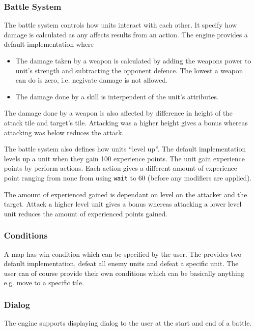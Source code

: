 \subsubsection{Battle System}
\label{ssub:battle_system}

The battle system controls how units interact with each other.  It specify how damage is calculated as any affects results from an action. The engine provides a default implementation where 
\begin{itemize}
	\item The damage taken by a weapon is calculated by adding the weapons power to unit's strength and subtracting the opponent defence. The lowest a weapon can do is zero, i.e. negivate damage is not allowed.
	\item The damage done by a skill is interpendent of the unit's attributes.
\end{itemize}

The damage done by a weapon is also affected by difference in height of the attack tile and target's tile. Attacking was a higher height gives a bonus whereas attacking was below reduces the attack.


The battle system also defines how units ``level up''. The default implementation levels up a unit when they gain 100 experience points. The unit gain experience points by perform actions. Each action gives a different amount of experience point ranging from none from using \texttt{wait} to 60 (before any modifiers are applied).

The amount of experienced gained is dependant on level on the attacker and the target. Attack a higher level unit gives a bonus whereas attacking a lower level unit reduces the amount of experienced points gained.

\subsubsection{Conditions}
\label{ssub:events}

A map has win condition which can be specified by the user.  The provides two default implementation, defeat all enemy units and defeat a specific unit.  The user can of course provide their own conditions which can be basically anything e.g. move to a specific tile. 


\subsubsection{Dialog}
\label{ssub:dialog}
The engine supports displaying dialog to the user at the start and end of a battle. 

